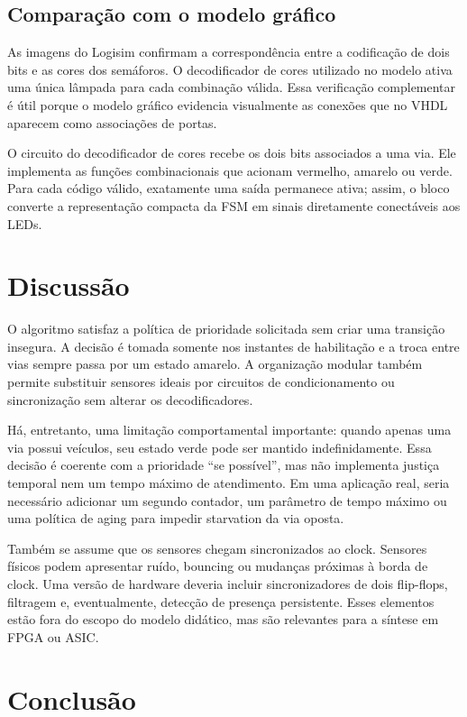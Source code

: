 \documentclass[conference]{IEEEtran}
\begin{document}
\subsection{Comparação com o modelo gráfico}

As imagens do Logisim confirmam a correspondência entre a codificação de
dois bits e as cores dos semáforos. O decodificador de cores utilizado no
modelo ativa uma única lâmpada para cada combinação válida. Essa verificação
complementar é útil porque o modelo
gráfico evidencia visualmente as conexões que no VHDL aparecem como
associações de portas.

O circuito do decodificador de cores recebe os dois bits associados a uma via.
Ele implementa as funções
combinacionais que acionam vermelho, amarelo ou verde. Para cada código
válido, exatamente uma saída permanece ativa; assim, o bloco converte a
representação compacta da FSM em sinais diretamente conectáveis aos LEDs.

\section{Discussão}
\label{sec:discussao}

O algoritmo satisfaz a política de prioridade solicitada sem criar uma
transição insegura. A decisão é tomada somente nos instantes de
habilitação e a troca entre vias sempre passa por um estado amarelo. A
organização modular também permite substituir sensores ideais por circuitos
de condicionamento ou sincronização sem alterar os decodificadores.

Há, entretanto, uma limitação comportamental importante: quando apenas uma
via possui veículos, seu estado verde pode ser mantido indefinidamente. Essa
decisão é coerente com a prioridade ``se possível'', mas não implementa
justiça temporal nem um tempo máximo de atendimento. Em uma aplicação real,
seria necessário adicionar um segundo contador, um parâmetro de tempo máximo
ou uma política de aging para impedir starvation da via oposta.

Também se assume que os sensores chegam sincronizados ao clock. Sensores
físicos podem apresentar ruído, bouncing ou mudanças próximas à borda de
clock. Uma versão de hardware deveria incluir sincronizadores de dois
flip-flops, filtragem e, eventualmente, detecção de presença persistente.
Esses elementos estão fora do escopo do modelo didático, mas são relevantes
para a síntese em FPGA ou ASIC.

\section{Conclusão}
\label{sec:conclusao}
\end{document}
